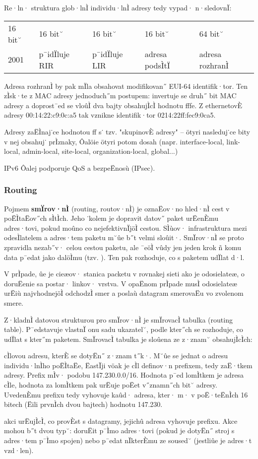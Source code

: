 Re·ln· struktura glob·lnÌ individu·lnÌ adresy tedy vypad· n·sledovnÏ:

\begin{center}
\begin{tabular}{|l|l|l|l|l|}
	\hline
	16 bit˘ & 16 bit˘ & 16 bit˘ & 16 bit˘ & 64 bit˘ \\
	2001 & p¯idÏluje RIR &p¯idÏluje LIR &adresa podsÌtÏ & adresa rozhranÌ \\
	\hline
\end{tabular}
\end{center}
Adresa rozhranÌ by pak mÏla obsahovat modifikovan˝ EUI-64 identifik·tor. Ten zÌsk·te z MAC adresy jednoduch˝m postupem: invertuje se druh˝ bit MAC adresy a doprost¯ed se vloûÌ dva bajty obsahujÌcÌ hodnotu fffe. Z ethernetovÈ adresy 00:14:22:c9:0c:a5 tak vznikne identifik·tor 0214:22ff:fec9:0ca5.

Adresy zaËÌnaj˙ce hodnotou ff s˙ tzv. "skupinovÈ adresy" -- ötyri nasleduj˙ce bity v nej obsahuj˙ prÌznaky, Ôalöie ötyri potom dosah (napr. interface-local, link-local, admin-local, site-local, organization-local, global...)

IPv6 Ôalej podporuje QoS a bezpeËnosù (IPsec).

\subsubsection*{Routing} 
Pojmem \textbf{smÏrov·nÌ} (routing, routov·nÌ) je oznaËov·no hled·nÌ cest v poËÌtaËov˝ch sÌtÌch. Jeho ˙kolem je dopravit datov˝ paket urËenÈmu adres·tovi, pokud moûno co nejefektivnÏjöÌ cestou. SÌùov· infrastruktura mezi odesÌlatelem a adres·tem paketu m˘ûe b˝t velmi sloûit·. SmÏrov·nÌ se proto zpravidla nezab˝v· celou cestou paketu, ale ¯eöÌ vûdy jen jeden krok ñ komu data p¯edat jako dalöÌmu (tzv. ). Ten pak rozhoduje, co s paketem udÏlat d·l.

V prÌpade, ûe je cieæov· stanica packetu v rovnakej sieti ako je odosielateæ, o doruËenie sa postar· linkov· vrstva. V opaËnom prÌpade musÌ odosielateæ urËiù najvhodnejöÌ odchodzÌ smer a poslaù datagram smerovaËu vo zvolenom smere.

Z·kladnÌ datovou strukturou pro smÏrov·nÌ je smÏrovacÌ tabulka (routing table). P¯edstavuje vlastnÏ onu sadu ukazatel˘, podle kter˝ch se rozhoduje, co udÏlat s kter˝m paketem. SmÏrovacÌ tabulka je sloûena ze z·znam˘ obsahujÌcÌch:
\begin{pitemize}
	\item cÌlovou adresu, kterÈ se dotyËn˝ z·znam t˝k·. M˘ûe se jednat o adresu individu·lnÌho poËÌtaËe, ËastÏji vöak je cÌl definov·n prefixem, tedy zaË·tkem adresy. Prefix mÌv· podobu 147.230.0.0/16. Hodnota p¯ed lomÌtkem je adresa cÌle, hodnota za lomÌtkem pak urËuje poËet v˝znamn˝ch bit˘ adresy. UvedenÈmu prefixu tedy vyhovuje kaûd· adresa, kter· m· v poË·teËnÌch 16 bitech (Ëili prvnÌch dvou bajtech) hodnotu 147.230.
    \item akci urËujÌcÌ, co provÈst s datagramy, jejichû adresa vyhovuje prefixu. Akce mohou b˝t dvou typ˘: doruËit p¯Ìmo adres·tovi (pokud je dotyËn˝ stroj s adres·tem p¯Ìmo spojen) nebo p¯edat nÏkterÈmu ze soused˘ (jestliûe je adres·t vzd·len).
\end{pitemize}


